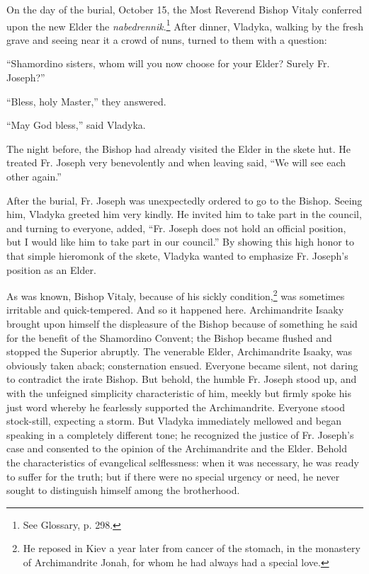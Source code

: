 On the day of the burial, October 15, the Most Reverend Bishop Vitaly conferred upon the new Elder the \textit{nabedrennik}.\footnote{See Glossary, p. 298.} After dinner, Vladyka, walking by the fresh grave and seeing near it a crowd of nuns, turned to them with a question:

``Shamordino sisters, whom will you now choose for your Elder? Surely Fr. Joseph?''

``Bless, holy Master,'' they answered.

``May God bless,'' said Vladyka.

The night before, the Bishop had already visited the Elder in the skete hut. He treated Fr. Joseph very benevolently and when leaving said, ``We will see each other again.''

After the burial, Fr. Joseph was unexpectedly ordered to go to the Bishop. Seeing him, Vladyka greeted him very kindly. He invited him to take part in the council, and turning to everyone, added, ``Fr. Joseph does not hold an official position, but I would like him to take part in our council.'' By showing this high honor to that simple hieromonk of the skete, Vladyka wanted to emphasize Fr. Joseph's position as an Elder.

As was known, Bishop Vitaly, because of his sickly condition,\footnote{He reposed in Kiev a year later from cancer of the stomach, in the monastery of Archimandrite Jonah, for whom he had always had a special love.} was sometimes irritable and quick-tempered. And so it happened here. Archimandrite Isaaky brought upon himself the displeasure of the Bishop because of something he said for the benefit of the Shamordino Convent; the Bishop became flushed and stopped the Superior abruptly. The venerable Elder, Archimandrite Isaaky, was obviously taken aback; consternation ensued. Everyone became silent, not daring to contradict the irate Bishop. But behold, the humble Fr. Joseph stood up, and with the unfeigned simplicity characteristic of him, meekly but firmly spoke his just word whereby he fearlessly supported the Archimandrite. Everyone stood stock-still, expecting a storm. But Vladyka immediately mellowed and began speaking in a completely different tone; he recognized the justice of Fr. Joseph's case and consented to the opinion of the Archimandrite and the Elder. Behold the characteristics of evangelical selflessness: when it was necessary, he was ready to suffer for the truth; but if there were no special urgency or need, he never sought to distinguish himself among the brotherhood.

